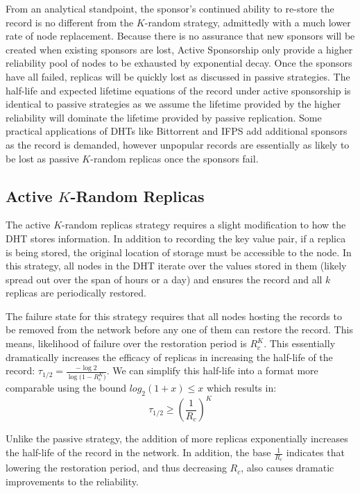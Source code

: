 	From an analytical standpoint, the sponsor's continued ability to re-store the record is no different from the $K$-random strategy, admittedly with a much lower rate of node replacement.
	Because there is no assurance that new sponsors will be created when existing sponsors are lost, Active Sponsorship only provide a higher reliability pool of nodes to be exhausted by exponential decay.
	Once the sponsors have all failed, replicas will be quickly lost as discussed in passive strategies.
	The half-life and expected lifetime equations of the record under active sponsorship is identical to passive strategies as we assume the lifetime provided by the higher reliability will dominate the lifetime provided by passive replication.
	Some practical applications of DHTs like Bittorrent\cite{bittorrent} and IFPS \cite{benet2014ipfs} add additional sponsors as the record is demanded, however unpopular records are essentially as likely to be lost as passive $K$-random replicas once the sponsors fail.
	
	\subsection{Active $K$-Random Replicas}
	The active $K$-random  replicas strategy requires a slight modification to how the DHT stores information.
	In addition to recording the key value pair, if a replica is being stored, the original location of storage must be accessible to the node.
	In this strategy, all nodes in the DHT iterate over the values stored in them (likely spread out over the span of hours or a day) and ensures the record and all $k$ replicas are periodically restored.
	
	The failure state for this strategy requires that all nodes hosting the records to be removed from the network before any one of them can restore the record.
	This means, likelihood of failure over the restoration period is $R_{c}^{K}$. This essentially dramatically increases the efficacy of replicas in increasing the half-life of the record: $\tau_{1/2} = \frac{-\log{2} }{\log{(1-R_{c}^{K}})}$.
	We can simplify this half-life into a format more comparable using the bound $log_{2}(1+x) \leq x$ which results in: 
	\begin{equation}\tau_{1/2} \geq (\frac{1}{R_{c}})^{K}\end{equation}
	
	Unlike the passive strategy, the addition of more replicas exponentially increases the half-life of the record in the network.
	In addition, the base $\frac{1}{R_{c}}$ indicates that lowering the restoration period, and thus decreasing $R_{c}$, also causes dramatic improvements to the reliability.
	

